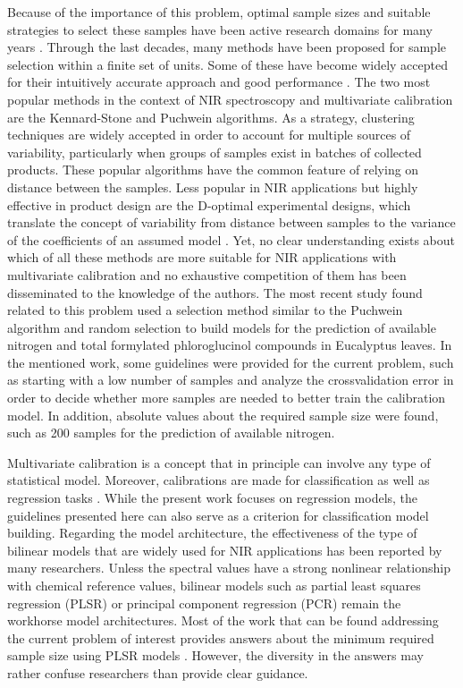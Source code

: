 \documentclass[journal=ancham,manuscript=article]{achemso}
\begin{document}
Because of the importance of this problem, optimal sample sizes and suitable strategies to select these samples have been active research domains for many years \cite{Ferre1996,Au2020, Liu2019}. Through the last decades, many methods have been proposed for sample selection within a finite set of units. Some of these have become widely accepted for their intuitively accurate approach and good performance \cite{Shetty2012a, Nawar2018, He2015}. The two most popular methods in the context of NIR spectroscopy and multivariate calibration are the Kennard-Stone\cite{Kennard1969} and  Puchwein\cite{Puchwein1988} algorithms. As a strategy, clustering techniques are widely accepted in order to account for multiple sources of variability\cite{Naes1990}, particularly when groups of samples exist in batches of collected products\cite{Bobelyn2010}. These popular algorithms have the common feature of relying on distance between the samples. Less popular in NIR applications but highly effective in product design are the D-optimal experimental designs, which translate the concept of variability from distance between samples to the variance of the coefficients of an assumed model \cite{Goos2011}. Yet, no clear understanding exists about which of all these methods are more suitable for NIR applications with multivariate calibration and no exhaustive competition of them has been disseminated to the knowledge of the authors. The most recent study found related to this problem used a selection method similar to the Puchwein algorithm and random selection to build models for the prediction of available nitrogen and total formylated phloroglucinol compounds in Eucalyptus leaves\cite{Au2020}. In the mentioned work, some guidelines were provided for the current problem, such as starting with a low number of samples and analyze the crossvalidation error in order to decide whether more samples are needed to better train the calibration model. In addition, absolute values about the required sample size were found, such as 200 samples for the prediction of available nitrogen\cite{Au2020}.

Multivariate calibration is a concept that in principle can involve any type of statistical model. Moreover, calibrations are made for classification as well as regression tasks \cite{Saeys2019}. While the present work focuses on regression models, the guidelines presented here can also serve as a criterion for classification model building. Regarding the model architecture, the effectiveness of the type of bilinear models that are widely used for NIR applications has been reported by many researchers. Unless the spectral values have a strong nonlinear relationship with chemical reference values, bilinear models such as partial least squares regression (PLSR) or principal component regression (PCR) remain the workhorse model architectures. Most of the work that can be found addressing the current problem of interest provides answers about the minimum required sample size using PLSR models \cite{Naes1990, Au2020, Shetty2012a, Rodionova2008}. However, the diversity in the answers may rather confuse researchers than provide clear guidance. 
\end{document}
